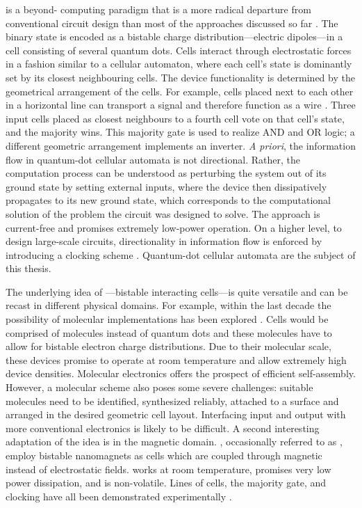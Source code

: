 \nocite{lent1993quantum, lent1993lines, tougaw1993bistable, lent1993bistable}
%
 is a beyond- computing paradigm that is a more radical
departure from conventional  circuit design than most of the
approaches discussed so far \cite{lent1993quantum}. The binary state is encoded
as a bistable charge distribution---electric dipoles---in a cell consisting of
several quantum dots. Cells interact through electrostatic forces in a fashion
similar to a cellular automaton, where each cell's state is dominantly set by
its closest neighbouring cells. The device functionality is determined by the
geometrical arrangement of the cells. For example, cells placed next to each
other in a horizontal line can transport a signal and therefore function as a
wire \cite{lent1993lines}. Three input cells placed as closest neighbours to
a fourth cell vote on that cell's state, and the majority wins. This majority
gate is used to realize AND and OR logic; a different geometric arrangement
implements an inverter. \emph{A priori}, the information flow in quantum-dot
cellular automata is not directional. Rather, the computation process can be
understood as perturbing the system out of its ground state by setting external
inputs, where the device then dissipatively propagates to its new ground state,
which corresponds to the computational solution of the problem the circuit was
designed to solve. The approach is current-free and promises extremely low-power
operation. On a higher level, to design large-scale  circuits,
directionality in information flow is enforced by introducing a clocking scheme
\cite{lent1997device}. Quantum-dot cellular automata are the subject of this
thesis.

The underlying idea of ---bistable interacting cells---is quite
versatile and can be recast in different physical domains. For example, within
the last decade the possibility of molecular  implementations has been
explored \cite{lent2000bypassing, lent2003molecular}. Cells would be comprised
of molecules instead of quantum dots and these molecules have to allow for
bistable electron charge distributions. Due to their molecular scale, these
devices promise to operate at room temperature and allow extremely high device
densities. Molecular electronics offers the prospect of efficient
self-assembly. However, a molecular  scheme also poses some severe
challenges: suitable molecules need to be identified, synthesized reliably,
attached to a surface and arranged in the desired geometric cell layout.
Interfacing input and output with more conventional electronics is likely to be
difficult. A second interesting adaptation of the  idea is in the
magnetic domain.  \cite{cowburn2000room, bernstein2005magnetic},
occasionally referred to as  \cite{cavin2012science}, employ bistable
nanomagnets as cells which are coupled through magnetic instead of electrostatic
fields.  works at room temperature, promises very low power
dissipation, and is non-volatile. Lines of cells, the majority gate, and
clocking have all been demonstrated experimentally \cite{imre2006majority,
alam2007clocking, alam2012chip}.

